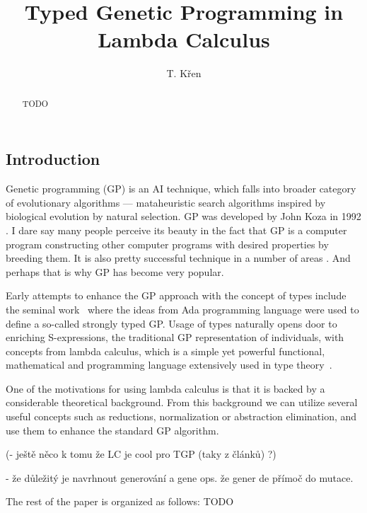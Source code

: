 \documentclass[11pt]{article}
\newcommand{\red}[1]{{\color{red} #1}}
\begin{document}
\setlength{\pdfpagewidth}{210mm}
\setlength{\pdfpageheight}{297mm}


\title{Typed Genetic Programming in Lambda Calculus}

\author{T. K\v ren}



\begin{abstract}
\red{TODO}
\end{abstract}

\begin{article}

\section{Introduction}


Genetic programming (GP) is an AI technique, which falls into broader category of evolutionary algorithms  ---  mataheuristic  search algorithms inspired  by biological evolution by natural selection. GP was developed by John Koza in 1992 \cite{koza92}. I dare say many people perceive its beauty in the fact that GP is a computer program  constructing other computer programs with desired properties by breeding them. It is also pretty successful technique in a number of areas \citep{koza2003genetic}. And perhaps that is why GP has become very popular.


Early attempts to enhance the GP approach with the concept of types include the seminal work~\citep{montana95} where the ideas from Ada programming language were used to define a so-called strongly typed GP.   
Usage of types naturally opens door to enriching S-expressions,
the traditional GP representation of individuals, with concepts from
lambda calculus, which is a simple yet powerful functional, mathematical and programming language extensively used in type theory~\citep{yu01}. 

One of the motivations for using lambda calculus is that it is backed by a considerable theoretical background. From this background we can utilize several useful concepts such as reductions, normalization or abstraction elimination, and use them to enhance the standard GP algorithm.


\red{(- ještě něco k tomu že LC je cool pro TGP (taky z článků) ?)}

\red{- že důležitý je navrhnout generování a gene ops. že gener de přímoč do mutace.}

The rest of the paper is organized as follows: \red{TODO}


\end{article}
\end{document}
